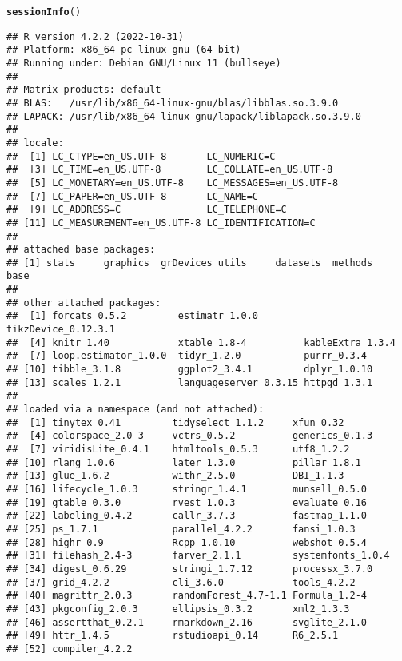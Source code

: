 \documentclass[12pt]{article}\usepackage[]{graphicx}\usepackage[]{xcolor}
\makeatletter
\newcommand{\hlstd}[1]{\textcolor[rgb]{0.345,0.345,0.345}{#1}}%
\newcommand{\hlkwd}[1]{\textcolor[rgb]{0.737,0.353,0.396}{\textbf{#1}}}%
\newenvironment{kframe}{%
 \def\at@end@of@kframe{}%
 \ifinner\ifhmode%
  \def\at@end@of@kframe{\end{minipage}}%
  \begin{minipage}{\columnwidth}%
 \fi\fi%
 \def\FrameCommand##1{\hskip\@totalleftmargin \hskip-\fboxsep
 \colorbox{shadecolor}{##1}\hskip-\fboxsep
     \hskip-\linewidth \hskip-\@totalleftmargin \hskip\columnwidth}%
 \MakeFramed {\advance\hsize-\width
   \@totalleftmargin\z@ \linewidth\hsize
   \@setminipage}}%
 {\par\unskip\endMakeFramed%
 \at@end@of@kframe}
\newenvironment{knitrout}{}{} %
\makeatother
\begin{document}
\begin{knitrout}
\color{fgcolor}\begin{kframe}
\begin{alltt}
\hlkwd{sessionInfo}\hlstd{()}
\end{alltt}
\begin{verbatim}
## R version 4.2.2 (2022-10-31)
## Platform: x86_64-pc-linux-gnu (64-bit)
## Running under: Debian GNU/Linux 11 (bullseye)
## 
## Matrix products: default
## BLAS:   /usr/lib/x86_64-linux-gnu/blas/libblas.so.3.9.0
## LAPACK: /usr/lib/x86_64-linux-gnu/lapack/liblapack.so.3.9.0
## 
## locale:
##  [1] LC_CTYPE=en_US.UTF-8       LC_NUMERIC=C              
##  [3] LC_TIME=en_US.UTF-8        LC_COLLATE=en_US.UTF-8    
##  [5] LC_MONETARY=en_US.UTF-8    LC_MESSAGES=en_US.UTF-8   
##  [7] LC_PAPER=en_US.UTF-8       LC_NAME=C                 
##  [9] LC_ADDRESS=C               LC_TELEPHONE=C            
## [11] LC_MEASUREMENT=en_US.UTF-8 LC_IDENTIFICATION=C       
## 
## attached base packages:
## [1] stats     graphics  grDevices utils     datasets  methods   base     
## 
## other attached packages:
##  [1] forcats_0.5.2         estimatr_1.0.0        tikzDevice_0.12.3.1  
##  [4] knitr_1.40            xtable_1.8-4          kableExtra_1.3.4     
##  [7] loop.estimator_1.0.0  tidyr_1.2.0           purrr_0.3.4          
## [10] tibble_3.1.8          ggplot2_3.4.1         dplyr_1.0.10         
## [13] scales_1.2.1          languageserver_0.3.15 httpgd_1.3.1         
## 
## loaded via a namespace (and not attached):
##  [1] tinytex_0.41         tidyselect_1.1.2     xfun_0.32           
##  [4] colorspace_2.0-3     vctrs_0.5.2          generics_0.1.3      
##  [7] viridisLite_0.4.1    htmltools_0.5.3      utf8_1.2.2          
## [10] rlang_1.0.6          later_1.3.0          pillar_1.8.1        
## [13] glue_1.6.2           withr_2.5.0          DBI_1.1.3           
## [16] lifecycle_1.0.3      stringr_1.4.1        munsell_0.5.0       
## [19] gtable_0.3.0         rvest_1.0.3          evaluate_0.16       
## [22] labeling_0.4.2       callr_3.7.3          fastmap_1.1.0       
## [25] ps_1.7.1             parallel_4.2.2       fansi_1.0.3         
## [28] highr_0.9            Rcpp_1.0.10          webshot_0.5.4       
## [31] filehash_2.4-3       farver_2.1.1         systemfonts_1.0.4   
## [34] digest_0.6.29        stringi_1.7.12       processx_3.7.0      
## [37] grid_4.2.2           cli_3.6.0            tools_4.2.2         
## [40] magrittr_2.0.3       randomForest_4.7-1.1 Formula_1.2-4       
## [43] pkgconfig_2.0.3      ellipsis_0.3.2       xml2_1.3.3          
## [46] assertthat_0.2.1     rmarkdown_2.16       svglite_2.1.0       
## [49] httr_1.4.5           rstudioapi_0.14      R6_2.5.1            
## [52] compiler_4.2.2
\end{verbatim}
\end{kframe}
\end{knitrout}
\end{document}
